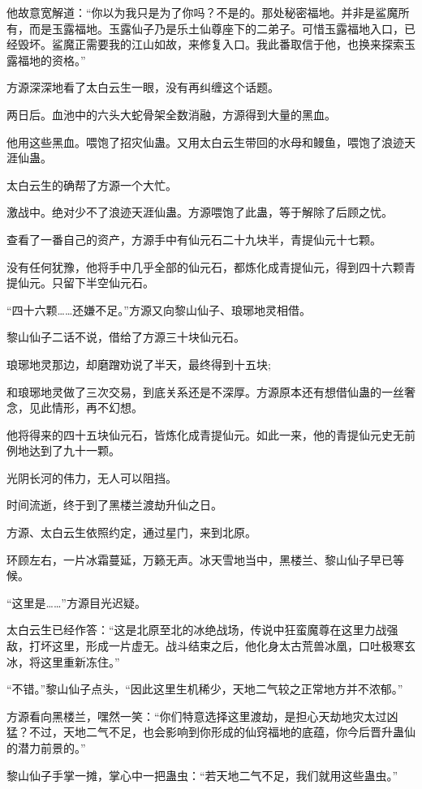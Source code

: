 \begin{this_body}
他故意宽解道：“你以为我只是为了你吗？不是的。那处秘密福地。并非是鲨魔所有，而是玉露福地。玉露仙子乃是乐土仙尊座下的二弟子。可惜玉露福地入口，已经毁坏。鲨魔正需要我的江山如故，来修复入口。我此番取信于他，也换来探索玉露福地的资格。”

方源深深地看了太白云生一眼，没有再纠缠这个话题。

两日后。血池中的六头大蛇骨架全数消融，方源得到大量的黑血。

他用这些黑血。喂饱了招灾仙蛊。又用太白云生带回的水母和鳗鱼，喂饱了浪迹天涯仙蛊。

太白云生的确帮了方源一个大忙。

激战中。绝对少不了浪迹天涯仙蛊。方源喂饱了此蛊，等于解除了后顾之忧。

查看了一番自己的资产，方源手中有仙元石二十九块半，青提仙元十七颗。

没有任何犹豫，他将手中几乎全部的仙元石，都炼化成青提仙元，得到四十六颗青提仙元。只留下半空仙元石。

“四十六颗……还嫌不足。”方源又向黎山仙子、琅琊地灵相借。

黎山仙子二话不说，借给了方源三十块仙元石。

琅琊地灵那边，却磨蹭劝说了半天，最终得到十五块;

和琅琊地灵做了三次交易，到底关系还是不深厚。方源原本还有想借仙蛊的一丝奢念，见此情形，再不幻想。

他将得来的四十五块仙元石，皆炼化成青提仙元。如此一来，他的青提仙元史无前例地达到了九十一颗。

光阴长河的伟力，无人可以阻挡。

时间流逝，终于到了黑楼兰渡劫升仙之日。

方源、太白云生依照约定，通过星门，来到北原。

环顾左右，一片冰霜蔓延，万籁无声。冰天雪地当中，黑楼兰、黎山仙子早已等候。

“这里是……”方源目光迟疑。

太白云生已经作答：“这是北原至北的冰绝战场，传说中狂蛮魔尊在这里力战强敌，打坏这里，形成一片虚无。战斗结束之后，他化身太古荒兽冰凰，口吐极寒玄冰，将这里重新冻住。”

“不错。”黎山仙子点头，“因此这里生机稀少，天地二气较之正常地方并不浓郁。”

方源看向黑楼兰，嘿然一笑：“你们特意选择这里渡劫，是担心天劫地灾太过凶猛？不过，天地二气不足，也会影响到你形成的仙窍福地的底蕴，你今后晋升蛊仙的潜力前景的。”

黎山仙子手掌一摊，掌心中一把蛊虫：“若天地二气不足，我们就用这些蛊虫。”


\end{this_body}
